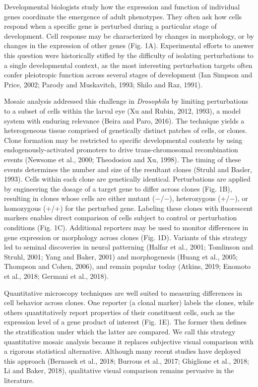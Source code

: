 Developmental biologists study how the expression and function of individual genes coordinate the emergence of adult phenotypes. They often ask how cells respond when a specific gene is perturbed during a particular stage of development. Cell response may be characterized by changes in morphology, or by changes in the expression of other genes (Fig. 1A). Experimental efforts to answer this question were historically stifled by the difficulty of isolating perturbations to a single developmental context, as the most interesting perturbation targets often confer pleiotropic function across several stages of development (Ian Simpson and Price, 2002; Parody and Muskavitch, 1993; Shilo and Raz, 1991).

Mosaic analysis addressed this challenge in \emph{Drosophila} by limiting perturbations to a subset of cells within the larval eye (Xu and Rubin, 2012, 1993), a model system with enduring relevance (Beira and Paro, 2016). The technique yields a heterogeneous tissue comprised of genetically distinct patches of cells, or clones. Clone formation may be restricted to specific developmental contexts by using endogenously-activated promoters to drive trans-chromosomal recombination events (Newsome et al., 2000; Theodosiou and Xu, 1998). The timing of these events determines the number and size of the resultant clones (Struhl and Basler, 1993). Cells within each clone are genetically identical. Perturbations are applied by engineering the dosage of a target gene to differ across clones (Fig. 1B), resulting in clones whose cells are either mutant (−/−), heterozygous (+/−), or homozygous (+/+) for the perturbed gene. Labeling these clones with fluorescent markers enables direct comparison of cells subject to control or perturbation conditions (Fig. 1C). Additional reporters may be used to monitor differences in gene expression or morphology across clones (Fig. 1D). Variants of this strategy led to seminal discoveries in neural patterning (Halfar et al., 2001; Tomlinson and Struhl, 2001; Yang and Baker, 2001) and morphogenesis (Huang et al., 2005; Thompson and Cohen, 2006), and remain popular today (Atkins, 2019; Enomoto et al., 2018; Germani et al., 2018).

Quantitative microscopy techniques are well suited to measuring differences in cell behavior across clones. One reporter (a clonal marker) labels the clones, while others quantitatively report properties of their constituent cells, such as the expression level of a gene product of interest (Fig. 1E). The former then defines the stratification under which the latter are compared. We call this strategy quantitative mosaic analysis because it replaces subjective visual comparison with a rigorous statistical alternative. Although many recent studies have deployed this approach (Bernasek et al., 2018; Burrous et al., 2017; Ghiglione et al., 2018; Li and Baker, 2018), qualitative visual comparison remains pervasive in the literature.

